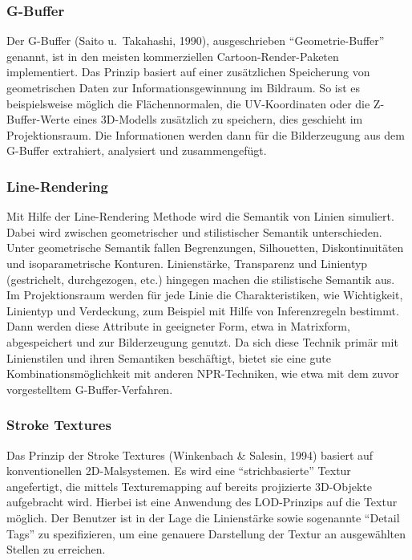 \subsubsection{G-Buffer}
Der G-Buffer (Saito u.\ Takahashi, 1990), ausgeschrieben "`Geometrie-Buffer"' 
genannt, ist in den meisten kommerziellen Cartoon-Render-Paketen implementiert. 
Das Prinzip basiert auf einer zusätzlichen Speicherung von geometrischen Daten 
zur Informationsgewinnung im Bildraum. So ist es beispielsweise möglich die 
Flächennormalen, die UV-Koordinaten oder die Z-Buffer-Werte eines 3D-Modells 
zusätzlich zu speichern, dies geschieht im Projektionsraum. Die Informationen 
werden dann für die Bilderzeugung aus dem G-Buffer extrahiert, analysiert und 
zusammengefügt.

\subsubsection{Line-Rendering}
Mit Hilfe der Line-Rendering Methode wird die Semantik von Linien simuliert. 
Dabei wird zwischen geometrischer und stilistischer Semantik unterschieden. 
Unter geometrische Semantik fallen Begrenzungen, Silhouetten, Diskontinuitäten 
und isoparametrische Konturen. Linienstärke, Transparenz und Linientyp 
(gestrichelt, durchgezogen, etc.) hingegen machen die stilistische Semantik 
aus. Im Projektionsraum werden für jede Linie die Charakteristiken, wie 
Wichtigkeit, Linientyp und Verdeckung, zum Beispiel mit Hilfe von 
Inferenzregeln bestimmt. Dann werden diese Attribute in geeigneter Form, etwa 
in Matrixform, abgespeichert und zur Bilderzeugung genutzt. Da sich diese 
Technik primär mit Linienstilen und ihren Semantiken beschäftigt, bietet sie 
eine gute Kombinationsmöglichkeit mit anderen NPR-Techniken, wie etwa mit dem 
zuvor vorgestelltem G-Buffer-Verfahren.

\subsubsection{Stroke Textures}
Das Prinzip der Stroke Textures (Winkenbach \& Salesin, 1994) basiert auf 
konventionellen 2D-Malsystemen. Es wird eine "`strichbasierte"' Textur 
angefertigt, die mittels Texturemapping auf bereits projizierte 3D-Objekte 
aufgebracht wird. Hierbei ist eine Anwendung des LOD-Prinzips auf die Textur 
möglich. Der Benutzer ist in der Lage die Linienstärke sowie sogenannte 
"`Detail Tags"' zu spezifizieren, um eine genauere Darstellung der Textur an 
ausgewählten Stellen zu erreichen.

